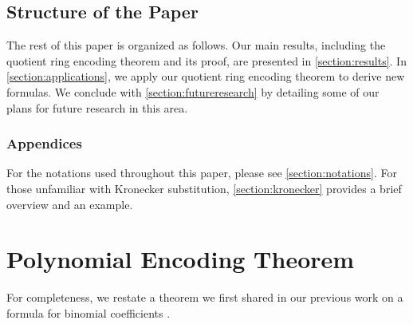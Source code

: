 \documentclass[12pt,reqno]{article}
\theoremstyle{plain}
\theoremstyle{definition}
\begin{document}
\subsection{Structure of the Paper}
The rest of this paper is organized as follows.  Our main results, including the quotient ring encoding theorem and its proof, are presented in \cref{section:results}. In \cref{section:applications}, we apply our quotient ring encoding theorem to derive new formulas. We conclude with \cref{section:futureresearch} by detailing some of our plans for future research in this area.

\subsubsection{Appendices}
For the notations used throughout this paper, please see \cref{section:notations}. For those unfamiliar with Kronecker substitution, \cref{section:kronecker} provides a brief overview and an example.

\section{Polynomial Encoding Theorem}
For completeness, we restate a theorem we first shared in our previous work on a formula for binomial coefficients \cite{shunia2023simple}.
\end{document}
